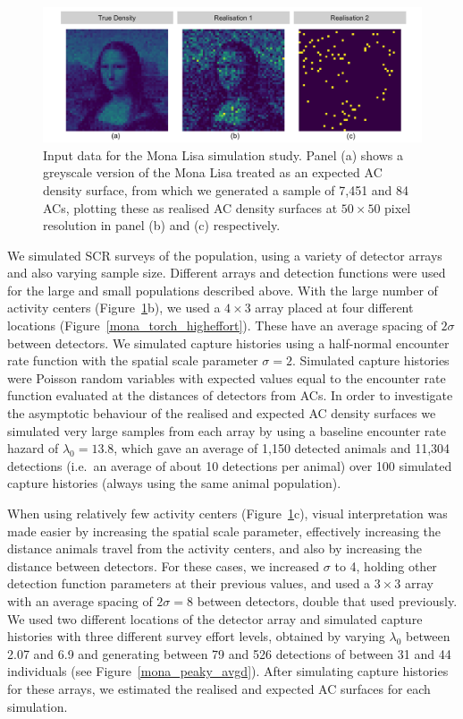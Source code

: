 \documentclass[useAMS,usenatbib,referee]{biom}
\begin{document}
\begin{figure}[htbp]
\centering
\includegraphics[width=1\textwidth]{mona_inputdata.png}
\caption{Input data for the Mona Lisa simulation study. Panel (a) shows a greyscale version of the Mona Lisa treated as an expected AC density surface, from which we generated a sample of 7,451 and 84 ACs, plotting these as realised AC density surfaces at $50\times 50$ pixel resolution in panel (b) and (c) respectively.}
\label{mlinputs}
\end{figure}

We simulated SCR surveys of the population, using a variety of detector arrays and also varying sample size. Different arrays and detection functions were used for the large and small populations described above. With the large number of activity centers (Figure~\ref{mlinputs}b), we used a $4\times 3$ array placed at four different locations (Figure~\ref{mona_torch_higheffort}). These have an average spacing of $2\sigma$ between detectors. We simulated capture histories using a half-normal encounter rate function with the spatial scale parameter $\sigma=2$. Simulated capture histories were Poisson random variables with expected values equal to the encounter rate function evaluated at the distances of detectors from ACs. In order to investigate the asymptotic behaviour of the realised and expected AC density surfaces we simulated very large samples from each array by using a baseline encounter rate hazard of $\lambda_0=13.8$, which gave an average of 1,150 detected animals and 11,304 detections (i.e.\ an average of about 10 detections per animal) over 100 simulated capture histories (always using the same animal population). 

When using relatively few activity centers (Figure~\ref{mlinputs}c), visual interpretation was made easier by increasing the spatial scale parameter, effectively increasing the distance animals travel from the activity centers, and also by increasing the distance between detectors. For these cases, we increased $\sigma$ to 4, holding other detection function parameters at their previous values, and used a $3 \times 3$ array with an average spacing of $2\sigma=8$ between detectors, double that used previously. We used two different locations of the detector array and simulated capture histories with three different survey effort levels, obtained by varying $\lambda_0$ between 2.07 and 6.9 and generating between 79 and 526 detections of between 31 and 44 individuals (see Figure~\ref{mona_peaky_avgd}). After simulating capture histories for these arrays, we estimated the realised and expected AC surfaces for each simulation. 
\end{document}
